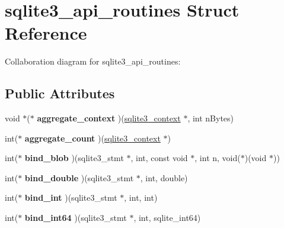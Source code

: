 \hypertarget{structsqlite3__api__routines}{}\section{sqlite3\+\_\+api\+\_\+routines Struct Reference}
\label{structsqlite3__api__routines}


Collaboration diagram for sqlite3\+\_\+api\+\_\+routines\+:
\subsection*{Public Attributes}
\begin{DoxyCompactItemize}
\item 
void $\ast$($\ast$ {\bfseries aggregate\+\_\+context} )(\hyperlink{structsqlite3__context}{sqlite3\+\_\+context} $\ast$, int n\+Bytes)\hypertarget{structsqlite3__api__routines_a16fafb5f2460657f528338aee5f65d25}{}\label{structsqlite3__api__routines_a16fafb5f2460657f528338aee5f65d25}

\item 
int($\ast$ {\bfseries aggregate\+\_\+count} )(\hyperlink{structsqlite3__context}{sqlite3\+\_\+context} $\ast$)\hypertarget{structsqlite3__api__routines_a8373f7a5dd2d6f1c86bbf024b1796156}{}\label{structsqlite3__api__routines_a8373f7a5dd2d6f1c86bbf024b1796156}

\item 
int($\ast$ {\bfseries bind\+\_\+blob} )(sqlite3\+\_\+stmt $\ast$, int, const void $\ast$, int n, void($\ast$)(void $\ast$))\hypertarget{structsqlite3__api__routines_afeb41d70ab5a221fec488560934c825b}{}\label{structsqlite3__api__routines_afeb41d70ab5a221fec488560934c825b}

\item 
int($\ast$ {\bfseries bind\+\_\+double} )(sqlite3\+\_\+stmt $\ast$, int, double)\hypertarget{structsqlite3__api__routines_aca43a229ce28397ba8c18a4d6e03e40c}{}\label{structsqlite3__api__routines_aca43a229ce28397ba8c18a4d6e03e40c}

\item 
int($\ast$ {\bfseries bind\+\_\+int} )(sqlite3\+\_\+stmt $\ast$, int, int)\hypertarget{structsqlite3__api__routines_a6fef49e6c9c1fa573c55cc6668a8448f}{}\label{structsqlite3__api__routines_a6fef49e6c9c1fa573c55cc6668a8448f}

\item 
int($\ast$ {\bfseries bind\+\_\+int64} )(sqlite3\+\_\+stmt $\ast$, int, sqlite\+\_\+int64)\hypertarget{structsqlite3__api__routines_a489304cada65abca390da9b751da8800}{}\label{structsqlite3__api__routines_a489304cada65abca390da9b751da8800}


\end{DoxyCompactItemize}
